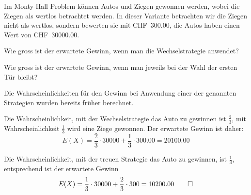 Im Monty-Hall Problem können Autos und Ziegen gewonnen werden, wobei
die Ziegen als wertlos betrachtet werden. In dieser Variante betrachten
wir die Ziegen nicht als wertlos, sondern bewerten sie mit CHF~300.00,
die Autos haben einen Wert von CHF~30000.00.
\begin{teilaufgaben}
\item Wie gross ist der erwartete Gewinn, wenn man die Wechselstrategie
anwendet?
\item Wie gross ist der erwartete Gewinn, wenn man jeweils bei der Wahl
der ersten Tür bleibt?
\end{teilaufgaben}


\begin{loesung}
Die Wahrscheinlichkeiten für den Gewinn bei Anwendung einer der
genannten Strategien wurden bereits früher berechnet.
\begin{teilaufgaben}
\item
Die Wahrscheinlichkeit, mit der Wechselstrategie das Auto zu gewinnen
ist $\frac23$, mit Wahrscheinlichkeit $\frac13$ wird eine Ziege gewonnen.
Der erwartete Gewinn ist daher:
\[
E(X)=\frac23\cdot 30000+\frac13\cdot 300.00=20100.00
\]
\item
Die Wahrscheinlichkeit, mit der treuen Strategie das Auto zu
gewinnen, ist $\frac13$, entsprechend ist der erwartete Gewinn
\[
E(X)=\frac13\cdot 30000+\frac23\cdot 300=10200.00
\qedhere
\]
\end{teilaufgaben}
\end{loesung}

